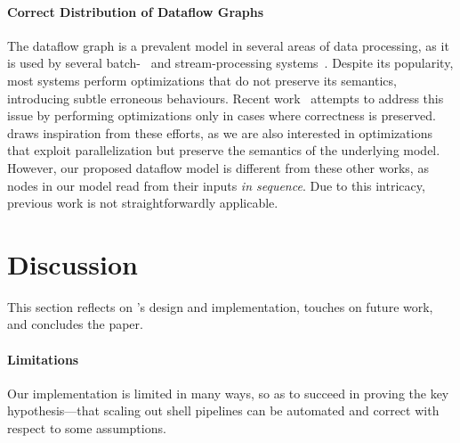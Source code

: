 \documentclass[acmsmall,10pt,review,anonymous]{acmart}
\newcommand{\km}[1]{[{\color{blue}#1 --- km}]}
\begin{document}
\paragraph{Correct Distribution of Dataflow Graphs}
%
The dataflow graph is a prevalent model in several areas
of data processing, as it is used by several batch-~\cite{mapreduce:08,
  spark:12} and stream-processing systems~\cite{murray2013naiad,
  carbone2015flink}. Despite its popularity, 
most systems perform optimizations that do not preserve its semantics,
introducing subtle erroneous behaviours. Recent work~\cite{HSSGG2014,
  SHGW2015, MSAIT2019} attempts to address this issue by performing
optimizations only in cases where correctness is
preserved. \sys draws inspiration from these efforts, as we are
also interested in optimizations that exploit parallelization but
preserve the semantics of the underlying model. However, our proposed
dataflow model is different from these other works, as nodes in our
model read from their inputs \emph{in sequence}. Due to this
intricacy, previous work is not straightforwardly applicable.

  

  


\section{Discussion}
\label{discussion}

This section reflects on \sys's design and implementation, touches on future work, and concludes the paper.

\paragraph{Limitations}
Our implementation is limited in many ways, so as to succeed in proving the key hypothesis---that scaling out shell pipelines can be automated and correct with respect to some assumptions.
\end{document}
